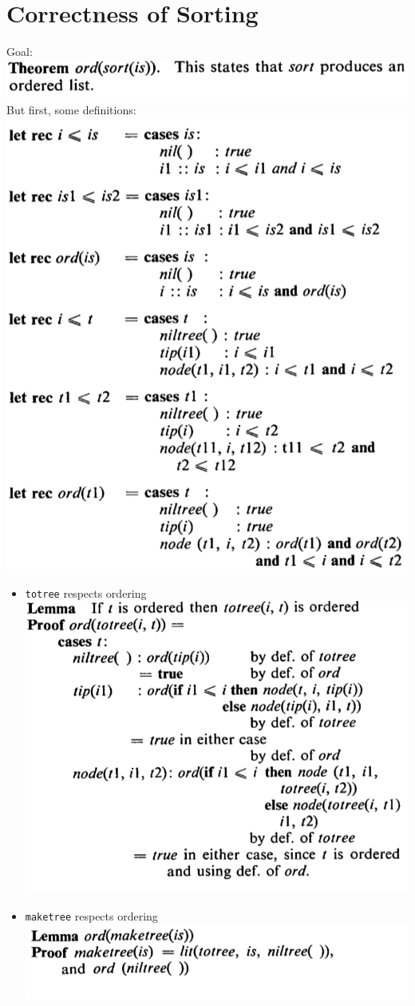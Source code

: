 \documentclass{beamer}
\newcommand{\code}[1]{\texttt{#1}}
\begin{document}
\section{Correctness of Sorting}
\begin{frame}
  Goal:
  {\center\includegraphics[width=.5\textwidth]{./sort-theorem.png}\\}
  But first, some definitions:\\

  {\center\includegraphics[width=.5\textwidth]{./orderings.png}\\}
\end{frame}
\begin{frame}
  \begin{itemize}
  \item \code{totree} respects ordering\\
    {\center\includegraphics[width=.5\textwidth]{./ord-totree.png}\\}
  \item \code{maketree} respects ordering\\
    {\center\includegraphics[width=.5\textwidth]{./ord-maketree.png}\\}
  \end{itemize}
\end{frame}
\end{document}
